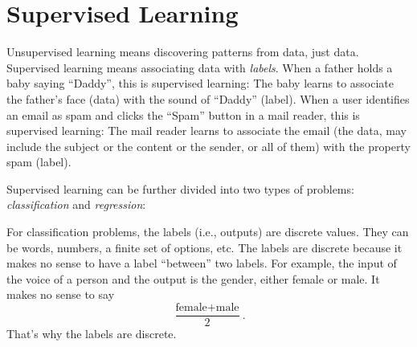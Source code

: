 \chapter{Supervised Learning}

Unsupervised learning means discovering patterns from data, just data.
Supervised learning means associating data with {\it labels}. When a
father holds a baby saying ``Daddy'', this is supervised learning: The
baby learns to associate the father's face (data) with the sound of
``Daddy'' (label). When a user identifies an email as spam and clicks
the ``Spam'' button in a mail reader, this is supervised learning: The
mail reader learns to associate the email (the data, may include the
subject or the content or the sender, or all of them) with the
property spam (label).


Supervised learning can be further divided into two types of problems:
{\it classification} and {\it regression}:

For classification problems, the labels (i.e., outputs) are discrete
values. They can be words, numbers, a finite set of options, etc.  The
labels are discrete because it makes no sense to have a label
``between'' two labels.  For example, the input of the voice of a
person and the output is the gender, either female or male.  It makes
no sense to say
\begin{equation}
  \frac{\text{female} + \text{male}}{2}.
\end{equation}
  That's why the labels are discrete.




